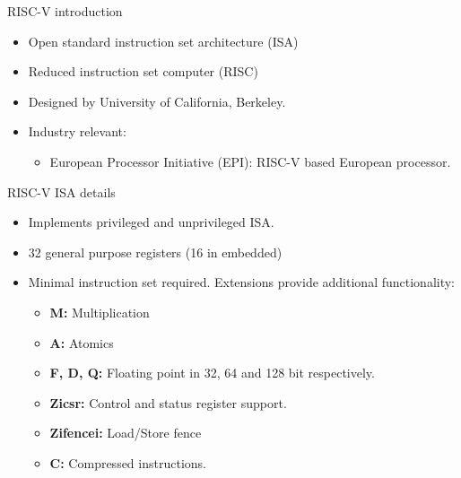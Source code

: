 \begin{frame}{RISC-V introduction}
  \begin{itemize}
     \item Open standard instruction set architecture (ISA)
     \item Reduced instruction set computer (RISC)
     \item Designed by University of California, Berkeley. 
     \item Industry relevant:
       \begin{itemize}
         \item European Processor Initiative (EPI): RISC-V based European processor.
       \end{itemize}
  \end{itemize}
\end{frame}

\begin{frame}{RISC-V ISA details}
  \begin{itemize}
     \item Implements privileged and unprivileged ISA.
     \item 32 general purpose registers (16 in embedded)
     \item Minimal instruction set required. Extensions provide additional functionality:
       \begin{itemize}
         \item \textbf{M:} Multiplication
         \item \textbf{A:} Atomics
         \item \textbf{F, D, Q:} Floating point in 32, 64 and 128 bit respectively.
         \item \textbf{Zicsr:} Control and status register support.
         \item \textbf{Zifencei:} Load/Store fence
         \item \textbf{C:} Compressed instructions.
       \end{itemize}
  \end{itemize}
\end{frame}

